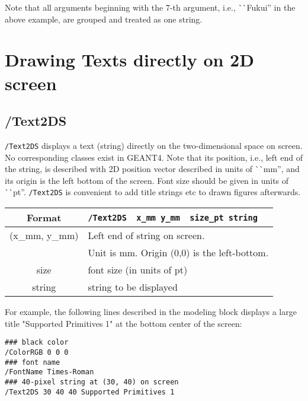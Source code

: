 \noindent
Note that all arguments beginning with the 7-th argument, 
i.e., ^^ ^^ Fukui'' in the above example, 
are grouped and treated as one string.



\section{Drawing Texts directly on 2D screen} 

\subsection{/Text2DS} 

\verb+/Text2DS+ displays a text (string) directly 
on the two-dimensional space on screen.
No corresponding classes exist in GEANT4.
Note that its position, i.e., left end of the string,
is described with 2D position vector described 
in units of ^^ ^^ mm'',
and its origin is the left bottom of the screen.
Font size should be given in units of ^^ ^^ pt''.
\verb+/Text2DS+ is convenient to add title strings etc 
to drawn figures afterwards.
\vspace{.20in}

\begin{tabular}{|c|l|}
\hline%
Format        & \verb+/Text2DS  x_mm y_mm  size_pt string+\\
\hline%
(x\_mm, y\_mm)  &  Left end of string on screen. \\
		&  Unit is mm. Origin (0,0) is the left-bottom.\\
\hline%
size       &  font size (in units of pt) \\
\hline%
string     &  string to be displayed \\
\hline%
\end{tabular}
\vspace{.20in}

\noindent
For example, the following lines described in the modeling block 
displays a large title "Supported Primitives 1" at the bottom center of 
the screen:  
\vspace{.20in}

\begin{verbatim}
### black color 
/ColorRGB 0 0 0 
### font name  
/FontName Times-Roman 
### 40-pixel string at (30, 40) on screen 
/Text2DS 30 40 40 Supported Primitives 1
\end{verbatim}


